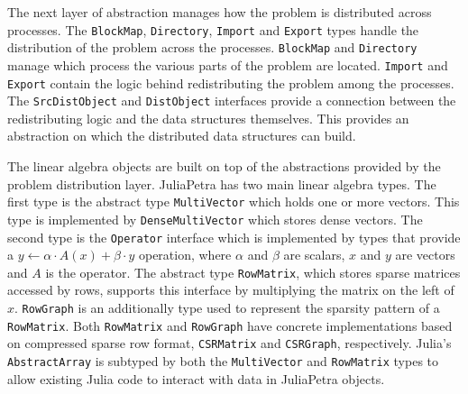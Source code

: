 \documentclass[acmsmall]{acmart}
\newcommand{\snippet}[1]{\lstinline[mathescape]{#1}}
\begin{document}
	The next layer of abstraction manages how the problem is distributed across processes.
	The \snippet{BlockMap}, \snippet{Directory}, \snippet{Import} and \snippet{Export}
	types handle the distribution of the problem across the processes.
	\snippet{BlockMap} and \snippet{Directory} manage which process the various parts of
	the problem are located.
	\snippet{Import} and \snippet{Export} contain the logic behind redistributing
	the problem among the processes.
	The \snippet{SrcDistObject} and \snippet{DistObject} interfaces provide a connection between
	the redistributing logic and the data structures themselves.
	This provides an abstraction on which the distributed data structures can build.
	
	The linear algebra objects are built on top of the abstractions provided by the problem distribution layer.
	JuliaPetra has two main linear algebra types.
	The first type is the abstract type \snippet{MultiVector} which holds one or more vectors.
	This type is implemented by \snippet{DenseMultiVector} which stores dense vectors.
	The second type is the \snippet{Operator} interface which is implemented by types that provide a
	\(y \gets \alpha\cdot A(x) + \beta\cdot y\) operation, where \(\alpha\) and \(\beta\) are scalars,
	\(x\) and \(y\) are vectors and \(A\) is the operator.
	The abstract type \snippet{RowMatrix}, which stores sparse matrices accessed by rows,
	supports this interface by multiplying the matrix on the left of \(x\).
	\snippet{RowGraph} is an additionally type used to represent the sparsity pattern of a \snippet{RowMatrix}.
	Both \snippet{RowMatrix} and \snippet{RowGraph} have concrete implementations based on
	compressed sparse row format, \snippet{CSRMatrix} and \snippet{CSRGraph}, respectively.
	Julia's \snippet{AbstractArray} is subtyped by both the \snippet{MultiVector}
	and \snippet{RowMatrix} types to allow existing Julia code to interact with data in JuliaPetra objects.
	
\end{document}
